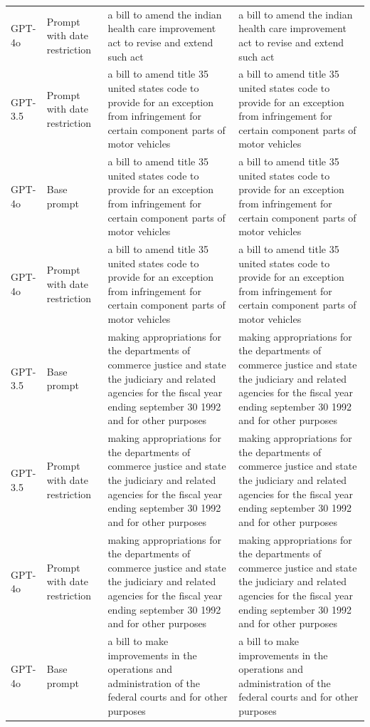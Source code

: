 \begin{longtable}{>{\raggedright\arraybackslash}p{1.4cm}>{\raggedright\arraybackslash}p{1.4cm}>{\raggedright\arraybackslash}p{5.5cm}>{\raggedright\arraybackslash}p{5.5cm}}
GPT-4o & Prompt with date restriction & a bill to amend the indian health care improvement act to revise and extend such act & a bill to amend the indian health care improvement act to revise and extend such act\\
GPT-3.5 & Prompt with date restriction & a bill to amend title 35 united states code to provide for an exception from infringement for certain component parts of motor vehicles & a bill to amend title 35 united states code to provide for an exception from infringement for certain component parts of motor vehicles\\
GPT-4o & Base prompt & a bill to amend title 35 united states code to provide for an exception from infringement for certain component parts of motor vehicles & a bill to amend title 35 united states code to provide for an exception from infringement for certain component parts of motor vehicles\\
GPT-4o & Prompt with date restriction & a bill to amend title 35 united states code to provide for an exception from infringement for certain component parts of motor vehicles & a bill to amend title 35 united states code to provide for an exception from infringement for certain component parts of motor vehicles\\
GPT-3.5 & Base prompt & making appropriations for the departments of commerce justice and state the judiciary and related agencies for the fiscal year ending september 30 1992 and for other purposes & making appropriations for the departments of commerce justice and state the judiciary and related agencies for the fiscal year ending september 30 1992 and for other purposes\\
GPT-3.5 & Prompt with date restriction & making appropriations for the departments of commerce justice and state the judiciary and related agencies for the fiscal year ending september 30 1992 and for other purposes & making appropriations for the departments of commerce justice and state the judiciary and related agencies for the fiscal year ending september 30 1992 and for other purposes\\
GPT-4o & Prompt with date restriction & making appropriations for the departments of commerce justice and state the judiciary and related agencies for the fiscal year ending september 30 1992 and for other purposes & making appropriations for the departments of commerce justice and state the judiciary and related agencies for the fiscal year ending september 30 1992 and for other purposes\\
GPT-4o & Base prompt & a bill to make improvements in the operations and administration of the federal courts and for other purposes & a bill to make improvements in the operations and administration of the federal courts and for other purposes\\

\end{longtable}
